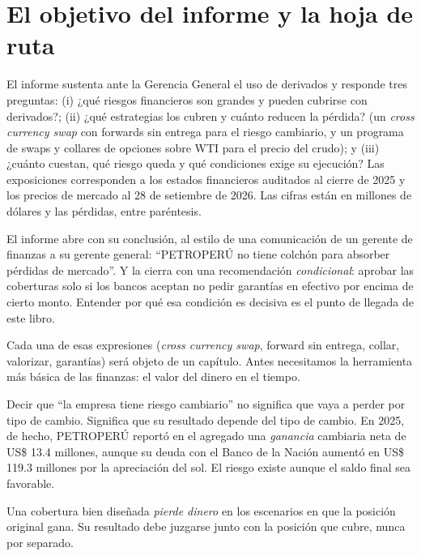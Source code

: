 \section{El objetivo del informe y la hoja de ruta}

El informe sustenta ante la Gerencia General el uso de derivados y responde tres preguntas: (i) ¿qué riesgos financieros son grandes y pueden cubrirse con derivados?; (ii) ¿qué estrategias los cubren y cuánto reducen la pérdida? (un \emph{cross currency swap} con forwards sin entrega para el riesgo cambiario, y un programa de swaps y collares de opciones sobre WTI para el precio del crudo); y (iii) ¿cuánto cuestan, qué riesgo queda y qué condiciones exige su ejecución? Las exposiciones corresponden a los estados financieros auditados al cierre de 2025 y los precios de mercado al 28 de setiembre de 2026. Las cifras están en millones de dólares y las pérdidas, entre paréntesis.

El informe abre con su conclusión, al estilo de una comunicación de un gerente de finanzas a su gerente general: \enquote{PETROPERÚ no tiene colchón para absorber pérdidas de mercado}. Y la cierra con una recomendación \emph{condicional}: aprobar las coberturas solo si los bancos aceptan no pedir garantías en efectivo por encima de cierto monto. Entender por qué esa condición es decisiva es el punto de llegada de este libro.

Cada una de esas expresiones (\emph{cross currency swap}, forward sin entrega, collar, valorizar, garantías) será objeto de un capítulo. Antes necesitamos la herramienta más básica de las finanzas: el valor del dinero en el tiempo.

\begin{cuidado}
Decir que \enquote{la empresa tiene riesgo cambiario} no significa que vaya a perder por tipo de cambio. Significa que su resultado depende del tipo de cambio. En 2025, de hecho, PETROPERÚ reportó en el agregado una \emph{ganancia} cambiaria neta de US\$ 13.4 millones, aunque su deuda con el Banco de la Nación aumentó en US\$ 119.3 millones por la apreciación del sol. El riesgo existe aunque el saldo final sea favorable.
\end{cuidado}

\begin{cuidado}
Una cobertura bien diseñada \emph{pierde dinero} en los escenarios en que la posición original gana. Su resultado debe juzgarse junto con la posición que cubre, nunca por separado.
\end{cuidado}

